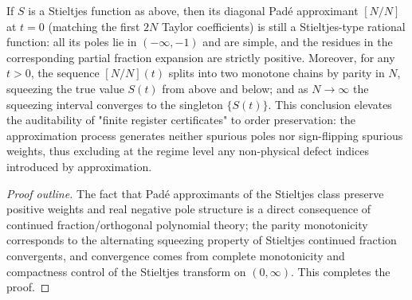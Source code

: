 \begin{proposition}\label{prop:xi-pade-stieltjes-order-preserving}
If \(S\) is a Stieltjes function as above, then its diagonal Pad\'e approximant \([N/N]\) at \(t=0\) (matching the first \(2N\) Taylor coefficients) is still a Stieltjes-type rational function: all its poles lie in \((-\infty,-1)\) and are simple, and the residues in the corresponding partial fraction expansion are strictly positive.
Moreover, for any \(t>0\), the sequence \([N/N](t)\) splits into two monotone chains by parity in \(N\), squeezing the true value \(S(t)\) from above and below; and as \(N\to\infty\) the squeezing interval converges to the singleton \(\{S(t)\}\).
This conclusion elevates the auditability of "finite register certificates" to order preservation: the approximation process generates neither spurious poles nor sign-flipping spurious weights, thus excluding at the regime level any non-physical defect indices introduced by approximation.
\end{proposition}
\begin{proof}[Proof outline]
The fact that Pad\'e approximants of the Stieltjes class preserve positive weights and real negative pole structure is a direct consequence of continued fraction/orthogonal polynomial theory; the parity monotonicity corresponds to the alternating squeezing property of Stieltjes continued fraction convergents, and convergence comes from complete monotonicity and compactness control of the Stieltjes transform on \((0,\infty)\). This completes the proof.
\end{proof}

